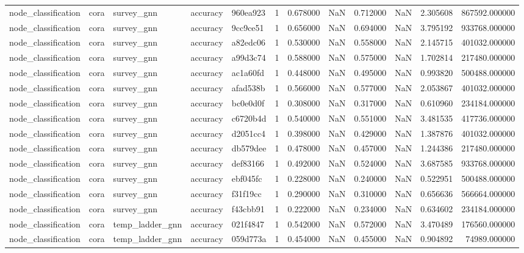 \begin{tabular}{lllllrrrrrrr}
node_classification & cora & survey_gnn & accuracy & 960ea923 & 1 & 0.678000 & NaN & 0.712000 & NaN & 2.305608 & 867592.000000 \\
node_classification & cora & survey_gnn & accuracy & 9cc9ce51 & 1 & 0.656000 & NaN & 0.694000 & NaN & 3.795192 & 933768.000000 \\
node_classification & cora & survey_gnn & accuracy & a82edc06 & 1 & 0.530000 & NaN & 0.558000 & NaN & 2.145715 & 401032.000000 \\
node_classification & cora & survey_gnn & accuracy & a99d3c74 & 1 & 0.588000 & NaN & 0.575000 & NaN & 1.702814 & 217480.000000 \\
node_classification & cora & survey_gnn & accuracy & ac1a60fd & 1 & 0.448000 & NaN & 0.495000 & NaN & 0.993820 & 500488.000000 \\
node_classification & cora & survey_gnn & accuracy & afad538b & 1 & 0.566000 & NaN & 0.577000 & NaN & 2.053867 & 401032.000000 \\
node_classification & cora & survey_gnn & accuracy & bc0e0d0f & 1 & 0.308000 & NaN & 0.317000 & NaN & 0.610960 & 234184.000000 \\
node_classification & cora & survey_gnn & accuracy & c6720b4d & 1 & 0.540000 & NaN & 0.551000 & NaN & 3.481535 & 417736.000000 \\
node_classification & cora & survey_gnn & accuracy & d2051cc4 & 1 & 0.398000 & NaN & 0.429000 & NaN & 1.387876 & 401032.000000 \\
node_classification & cora & survey_gnn & accuracy & db579dee & 1 & 0.478000 & NaN & 0.457000 & NaN & 1.244386 & 217480.000000 \\
node_classification & cora & survey_gnn & accuracy & def83166 & 1 & 0.492000 & NaN & 0.524000 & NaN & 3.687585 & 933768.000000 \\
node_classification & cora & survey_gnn & accuracy & ebf045fc & 1 & 0.228000 & NaN & 0.240000 & NaN & 0.522951 & 500488.000000 \\
node_classification & cora & survey_gnn & accuracy & f31f19cc & 1 & 0.290000 & NaN & 0.310000 & NaN & 0.656636 & 566664.000000 \\
node_classification & cora & survey_gnn & accuracy & f43cbb91 & 1 & 0.222000 & NaN & 0.234000 & NaN & 0.634602 & 234184.000000 \\
node_classification & cora & temp_ladder_gnn & accuracy & 021f4847 & 1 & 0.542000 & NaN & 0.572000 & NaN & 3.470489 & 176560.000000 \\
node_classification & cora & temp_ladder_gnn & accuracy & 059d773a & 1 & 0.454000 & NaN & 0.455000 & NaN & 0.904892 & 74989.000000 \\

\end{tabular}
